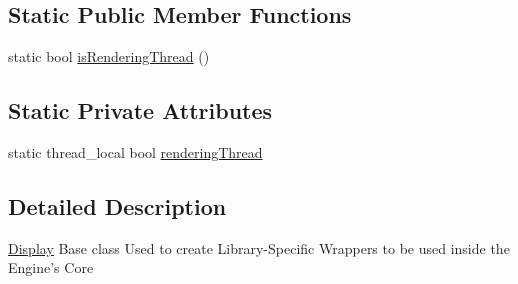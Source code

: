 \subsection*{Static Public Member Functions}
\begin{DoxyCompactItemize}
\item 
static bool \hyperlink{classZeta_1_1Display_adbe20015304e9c656029feef77bdb78d}{is\+Rendering\+Thread} ()
\end{DoxyCompactItemize}
\subsection*{Static Private Attributes}
\begin{DoxyCompactItemize}
\item 
static thread\+\_\+local bool \hyperlink{classZeta_1_1Display_a6c38447130075602f29a3ab3ba7c5d5c}{rendering\+Thread}
\end{DoxyCompactItemize}


\subsection{Detailed Description}
\hyperlink{classZeta_1_1Display}{Display} Base class Used to create Library-\/\+Specific Wrappers to be used inside the Engine's Core 

